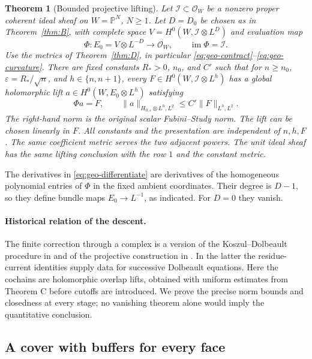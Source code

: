 \documentclass[11pt,reqno]{amsart}
\numberwithin{equation}{section}
\newtheorem{thmE}{Theorem}\renewcommand{\thethmE}{E}
\theoremstyle{definition}
\theoremstyle{remark}
\newcommand{\Pj}{\mathbb P}
\newcommand{\cO}{\mathcal O}
\newcommand{\cI}{\mathcal I}
\DeclareMathOperator{\im}{im}
\begin{document}
\begin{thmE}[Bounded projective lifting]\label{geo:lifting}
Let $\cI\subset\cO_W$ be a nonzero proper coherent ideal sheaf on
$W=\Pj^N$, $N\ge1$.  Let $D=D_0$ be chosen as in Theorem~\ref{thm:B}, with complete
space $V=H^0(W,\cI\otimes L^D)$ and evaluation map
\[
 \Phi:E_0=V\otimes L^{-D}\longrightarrow\cO_W,
 \qquad\im\Phi=\cI.
\]
Use the metrics of Theorem~\ref{thm:D}, in particular
\eqref{eq:geo-contract}--\eqref{eq:geo-curvature}.
There are fixed constants $R_*>0$, $n_0$, and $C'$ such that for
$n\ge n_0$, $\varepsilon=R_*/\sqrt n$, and $h\in\{n,n+1\}$,
every $F\in H^0(W,\cI\otimes L^h)$ has a global holomorphic lift
$a\in H^0(W,E_0\otimes L^h)$ satisfying
\begin{equation}\label{eq:geo-lift-bound}
 \Phi a=F,\qquad
 \|a\|_{H_{0,\varepsilon}\otimes L^h,L^2}
       \le C'\|F\|_{L^h,L^2}.
\end{equation}
The right-hand norm is the original scalar Fubini--Study norm.
The lift can be chosen linearly in $F$.  All constants and the
presentation are independent of $n,h,F$.  The same coefficient metric
serves the two adjacent powers. The unit ideal sheaf has the same lifting
conclusion with the row $1$ and the constant metric.
\end{thmE}

The derivatives in \eqref{eq:geo-differentiate} are derivatives of the
homogeneous polynomial entries of $\Phi$ in the fixed ambient
coordinates.  Their degree is $D-1$, so they define bundle maps
$E_0\to L^{-1}$, as indicated.  For $D=0$ they vanish.

\paragraph{Historical relation of the descent.}
The finite correction through a complex is a version of the
Koszul--Dolbeault procedure in \cite{KelleherTaylor,HormanderGenerators}
and of the projective construction in \cite[Section~6]{AnderssonWulcan}.
In the latter the residue-current identities supply data for successive
Dolbeault equations. Here the cochains are holomorphic overlap lifts,
obtained with uniform estimates from Theorem C before cutoffs are
introduced. We prove the precise norm bounds and closedness at every
stage; no vanishing theorem alone would imply the quantitative conclusion.

\subsection{A cover with buffers for every face}
\end{document}
